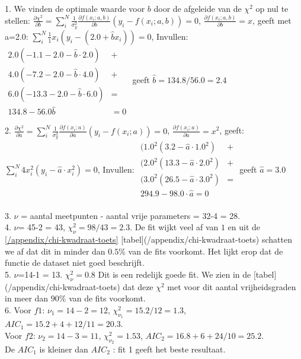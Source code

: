 1. We vinden de optimale waarde voor $b$ door de afgeleide van de $\chi^2$ op nul te stellen: ${\frac{\partial \chi^2}{\partial b} = \sum_i^N \frac{1}{\sigma_y^2} \frac{\partial f(x_i;a,b)}{\partial b} \left(y_i - f(x_i;a,b)\right) = 0 }$,
$\frac{\partial f(x_i;a,b)}{\partial b} = x$, 
geeft met a=2.0: 
${\sum_i^N \frac{1}{1} x_i(y_i - (2.0 + \hat{b} x_i )) = 0}$, 
Invullen: 
$\begin{aligned}
2.0 \left( -1.1 -  2.0 - \hat{b} \cdot 2.0\right) & +  \\
4.0 \left( -7.2 - 2.0 - \hat{b} \cdot 4.0 \right) & + \\
6.0 \left( -13.3 - 2.0 - \hat{b} \cdot 6.0 \right) & = \\
134.8 - 56.0 \hat{b} & = 0
\end{aligned}$
geeft $ \hat{b} = 134.8/56.0  = 2.4 $


2. ${\frac{\partial \chi^2}{\partial a} = \sum_i^N \frac{1}{\sigma_y^2} \frac{\partial f(x_i;a)}{\partial a} \left(y_i - f(x_i;a)\right) = 0 }$,
$\frac{\partial f(x_i;a)}{\partial a} = x^2$,
geeft:
${\sum_i^N {4} x^2_i \left( y_i - \hat{a} \cdot x_i^2 \right) = 0}$,
Invullen:
$\begin{aligned}
(1.0^2 \left( 3.2 - \hat{a} \cdot 1.0^2 \right) & +  \\
(2.0^2 \left( 13.3 - \hat{a} \cdot 2.0^2 \right) & + \\
(3.0^2 \left( 26.5 - \hat{a} \cdot 3.0^2 \right) & = \\
294.9 - 98.0 \cdot \hat{a} = 0 \\
\end{aligned}$
geeft $\hat{a} = 3.0$


3. $\nu$ = aantal meetpunten - aantal vrije parameters = 32-4 = 28.\\


4. $\nu$= 45-2 = 43, $\chi^2_\nu = 98/43 =2.3$. De fit wijkt veel af van $1$ en uit de \ref{/appendix/chi-kwadraat-toets} [tabel](/appendix/chi-kwadraat-toets) schatten we af dat dit in minder dan $0.5\%$ van de fits voorkomt. Het lijkt erop dat de functie de dataset niet goed beschrijft.\\


5. $\nu$=14-1 = 13. $\chi^2_\nu = 0.8$ Dit is een redelijk goede fit. We zien in de [tabel](/appendix/chi-kwadraat-toets) dat deze $\chi^2$ met voor dit aantal vrijheidsgraden in meer dan $90\%$ van de fits voorkomt.\\


6. Voor $f1$: $\nu_1 = 14-2 = 12$, $\chi^2_{\nu_1} = 15.2/12 = 1.3$, $AIC_1 = 15.2 + 4 + 12/11 = 20.3$.\\
Voor $f2$: $\nu_2 = 14 -3 = 11$, $\chi^2_{\nu_2} = 1.53 $, $AIC_2 = 16.8 + 6 + 24/10 = 25.2$.\\
De $AIC_1$ is kleiner dan $AIC_2$ : fit 1 geeft het beste resultaat.\\


